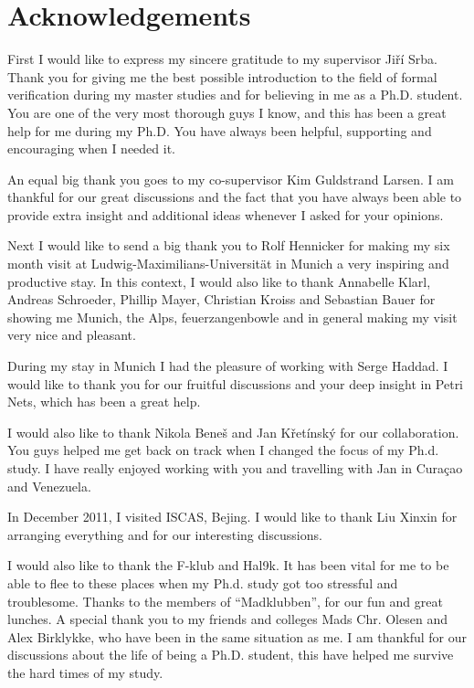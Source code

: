 
\chapter*{Acknowledgements}
\label{chap:acknowledgements}

First I would like to express my sincere gratitude to my supervisor Ji\v{r}\'{i} Srba. Thank you for giving me the best possible introduction to the field of formal verification during my master studies and for believing in me as a Ph.D. student. You are one of the very most thorough guys I know, and this has been a great help for me during my Ph.D. You have always been helpful, supporting and encouraging when I needed it.

An equal big thank you goes to my co-supervisor Kim Guldstrand Larsen. I am thankful for our great discussions and the fact that you have always been able to provide extra insight and additional ideas whenever I asked for your opinions.

Next I would like to send a big thank you to Rolf Hennicker for making my six month visit at Ludwig-Maximilians-Universit\"{a}t in Munich a very inspiring and productive stay. In this context, I would also like to thank Annabelle Klarl, Andreas Schroeder, Phillip Mayer, Christian Kroiss and Sebastian Bauer for showing me Munich, the Alps, feuerzangenbowle and in general making my visit very nice and pleasant.

During my stay in Munich I had the pleasure of working with Serge Haddad. I would like to thank you for our fruitful discussions and your deep insight in Petri Nets, which has been a great help.

I would also like to thank Nikola Bene\v{s} and Jan K\v{r}et\'{i}nsk\'{y} for our collaboration. You guys helped me get back on track when I changed the focus of my Ph.d. study. I have really enjoyed working with you and travelling with Jan in Cura\c{c}ao and Venezuela.

In December 2011, I visited ISCAS, Bejing. I would like to thank Liu Xinxin for arranging everything and for our interesting discussions.

I would also like to thank the F-klub and Hal9k. It has been vital for me to be able to flee to these places when my Ph.d. study got too stressful and troublesome. Thanks to the members of ``Madklubben'', for our fun and great lunches. A special thank you to my friends and colleges Mads Chr. Olesen and Alex Birklykke, who have been in the same situation as me. I am thankful for our discussions about the life of being a Ph.D. student, this have helped me survive the hard times of my study.

